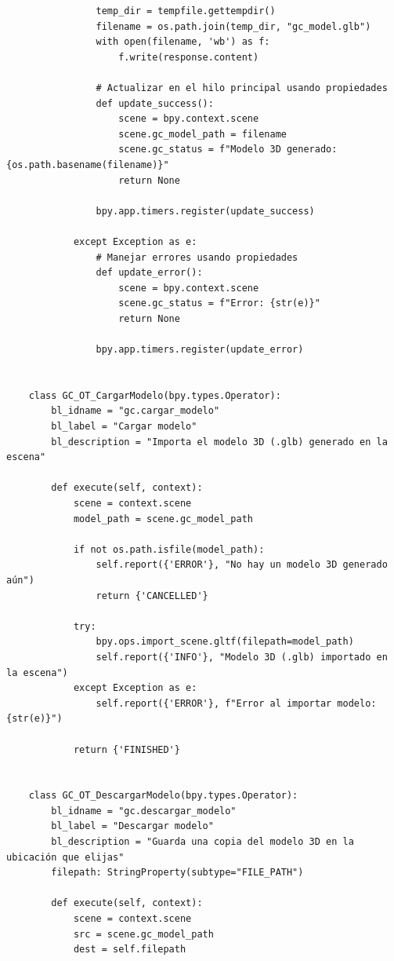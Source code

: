 \begin{verbatim}
                temp_dir = tempfile.gettempdir()
                filename = os.path.join(temp_dir, "gc_model.glb")
                with open(filename, 'wb') as f:
                    f.write(response.content)
    
                # Actualizar en el hilo principal usando propiedades
                def update_success():
                    scene = bpy.context.scene
                    scene.gc_model_path = filename
                    scene.gc_status = f"Modelo 3D generado: {os.path.basename(filename)}"
                    return None
                    
                bpy.app.timers.register(update_success)
    
            except Exception as e:
                # Manejar errores usando propiedades
                def update_error():
                    scene = bpy.context.scene
                    scene.gc_status = f"Error: {str(e)}"
                    return None
                    
                bpy.app.timers.register(update_error)
    
    
    class GC_OT_CargarModelo(bpy.types.Operator):
        bl_idname = "gc.cargar_modelo"
        bl_label = "Cargar modelo"
        bl_description = "Importa el modelo 3D (.glb) generado en la escena"
    
        def execute(self, context):
            scene = context.scene
            model_path = scene.gc_model_path
    
            if not os.path.isfile(model_path):
                self.report({'ERROR'}, "No hay un modelo 3D generado aún")
                return {'CANCELLED'}
    
            try:
                bpy.ops.import_scene.gltf(filepath=model_path)
                self.report({'INFO'}, "Modelo 3D (.glb) importado en la escena")
            except Exception as e:
                self.report({'ERROR'}, f"Error al importar modelo: {str(e)}")
    
            return {'FINISHED'}
    
    
    class GC_OT_DescargarModelo(bpy.types.Operator):
        bl_idname = "gc.descargar_modelo"
        bl_label = "Descargar modelo"
        bl_description = "Guarda una copia del modelo 3D en la ubicación que elijas"
        filepath: StringProperty(subtype="FILE_PATH")
    
        def execute(self, context):
            scene = context.scene
            src = scene.gc_model_path
            dest = self.filepath
    

\end{verbatim}
